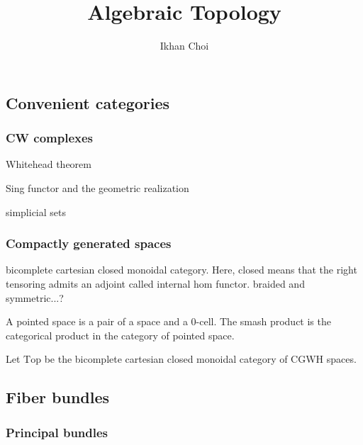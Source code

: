 \documentclass{../../large}
\begin{document}
\title{Algebraic Topology}
\author{Ikhan Choi}
\maketitle
\tableofcontents


\part{}

\chapter{Convenient categories}



\section{CW complexes}


Whitehead theorem

Sing functor and the geometric realization

simplicial sets


\section{Compactly generated spaces}
bicomplete cartesian closed monoidal category.
Here, closed means that the right tensoring admits an adjoint called internal hom functor.
braided and symmetric...?


A pointed space is a pair of a space and a 0-cell.
The smash product is the categorical product in the category of pointed space.


Let $\mathrm{Top}$ be the bicomplete cartesian closed monoidal category of CGWH spaces.











\chapter{Fiber bundles}


\section{Principal bundles}
\end{document}
